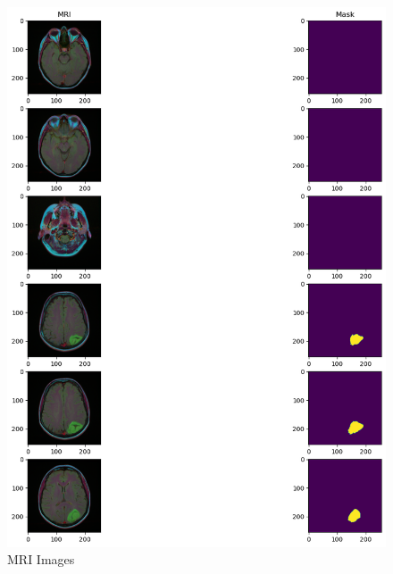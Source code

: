 \documentclass[11pt,a4paper]{article}
\begin{document}
\begin{figure}[H]
    \centering
    \includegraphics[width= 0.9\linewidth]{output.png}
    \caption{MRI Images}
    
\end{figure}

\vspace{1.0cm}
\end{document}
